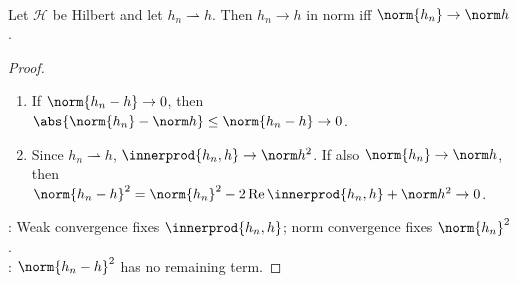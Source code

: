 \begin{theorem} \label{thm:radon-riesz-hilbert-space} \\
Let $\mathcal H$ be Hilbert and let $h_n\rightharpoonup h$. Then $h_n\to h$ in norm iff $\norm{h_n}\to\norm h$.
\begin{proof}
\begin{enumerate}[label=\roman*.]
\setlength{\itemsep}{0pt}
\item[$(\Rightarrow)$] If $\norm{h_n-h}\to0$, then $\abs{\norm{h_n}-\norm h}\leq\norm{h_n-h}\to0$.
\item[$(\Leftarrow)$] Since $h_n\rightharpoonup h$, $\innerprod{h_n,h}\to\norm h^2$. If also $\norm{h_n}\to\norm h$, then $\norm{h_n-h}^2=\norm{h_n}^2-2\operatorname{Re}\innerprod{h_n,h}+\norm h^2\to0$.
\end{enumerate}
: Weak convergence fixes $\innerprod{h_n,h}$; norm convergence fixes $\norm{h_n}^2$.\\
: $\norm{h_n-h}^2$ has no remaining term.
\end{proof}
\end{theorem}

